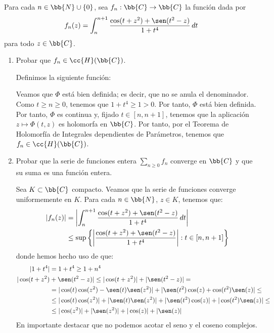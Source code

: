 \documentclass[12pt]{article}
\begin{document}
    \begin{ejercicio}[2.5 puntos]
        Para cada $n \in \bb{N} \cup \{0\}$, sea $f_n : \bb{C} \to \bb{C}$ la función dada por
        $$f_n(z) = \int_n^{n+1} \frac{\cos(t + z^2) + \sen(t^2 - z)}{1 + t^4} \, dt$$
        para todo $z \in \bb{C}$.
        \begin{enumerate}
            \item Probar que $f_n \in \cc{H}(\bb{C})$.
            
            Definimos la siguiente función:

            Veamos que $\Phi$ está bien definida; es decir, que no se anula el denominador. Como $t\geq n\geq 0$, tenemos que $1 + t^4 \geq 1 > 0$. Por tanto, $\Phi$ está bien definida.
            Por tanto, $\Phi$ es continua y, fijado $t\in [n,n+1]$, tenemos que la aplicación $z\mapsto \Phi(t,z)$ es holomorfa en $\bb{C}$.
            Por tanto, por el Teorema de Holomorfía de Integrales dependientes de Parámetros, tenemos que $f_n\in \cc{H}(\bb{C})$.
            \item Probar que la serie de funciones entera $\sum\limits_{n\geq 0} f_n$ converge en $\bb{C}$ y que su suma es una función entera.
            
            Sea $K\subset \bb{C}$ compacto. Veamos que la serie de funciones converge uniformemente en $K$. Para cada $n\in \bb{N}$, $z\in K$, tenemos que:
            \begin{align*}
                \left|f_n(z)\right|
                &= \left|\int_n^{n+1} \frac{\cos(t + z^2) + \sen(t^2 - z)}{1 + t^4} \, dt\right|\\
                &\leq \sup\left\{\left|\frac{\cos(t + z^2) + \sen(t^2 - z)}{1 + t^4}\right| : t\in [n,n+1]\right\} 
            \end{align*}
            donde hemos hecho uso de que:
            \begin{align*}
                |1+ t^4| &= 1+t^4\geq 1+n^4\\
                |\cos(t + z^2) &+ \sen(t^2 - z)|\leq |\cos(t + z^2)| + |\sen(t^2 - z)|=\\&=|\cos(t)\cos(z^2) - \sen(t)\sen(z^2)| + |\sen(t^2)\cos(z) + \cos(t^2)\sen(z)|
                \leq\\&\leq |\cos(t)\cos(z^2)| + |\sen(t)\sen(z^2)| + |\sen(t^2)\cos(z)| + |\cos(t^2)\sen(z)|
                \leq\\&\leq |\cos(z^2)| + |\sen(z^2)| + |\cos(z)| + |\sen(z)|
            \end{align*}
            En importante destacar que no podemos acotar el seno y el coseno complejos.


\end{enumerate}
\end{ejercicio}
\end{document}
